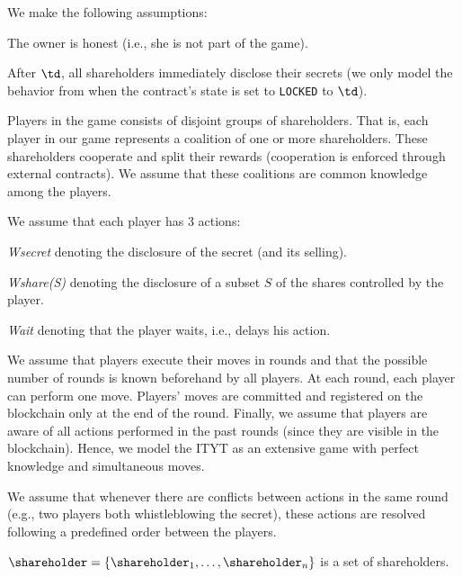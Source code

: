 %
We make the following assumptions:
\begin{compactenum} 
\item The owner is honest (i.e., she is not part of the game).

\item After $\td$, all shareholders immediately disclose their secrets (we only model the behavior from when the contract's state is set to \texttt{LOCKED} to $\td$).

\item Players in the game consists of disjoint groups of shareholders.
%
That is, each player in our game represents a coalition of one or more shareholders.
%
These shareholders cooperate and split their rewards (cooperation is enforced through external contracts).
%
We assume that these coalitions are common knowledge among the players.

\item We assume that each player has 3 actions: 
\begin{compactitem}
\item \textit{Wsecret} denoting the disclosure of the secret (and its selling).
\item \textit{Wshare(S)} denoting the disclosure of a subset $S$ of the shares controlled by the player.
\item \textit{Wait} denoting that the player waits, i.e., delays his action.
\end{compactitem}

\item We assume that players execute their moves in rounds and that the possible number of rounds is known beforehand by all players.
%
At each round, each player can perform one move. 
%
Players' moves are committed and registered on the blockchain only at the end of the round.
%
Finally, we assume that players are aware of all actions performed in the past rounds (since they are visible in the blockchain).
%
Hence, we model the ITYT as an extensive game with perfect knowledge and simultaneous moves. 

\item We assume that whenever there are conflicts between actions in the same round (e.g., two players both whistleblowing the secret), these actions are resolved following a predefined order between the players.

\end{compactenum}

%
$\shareholder = \{\shareholder_1, \ldots, \shareholder_n\}$ is a set of shareholders.

